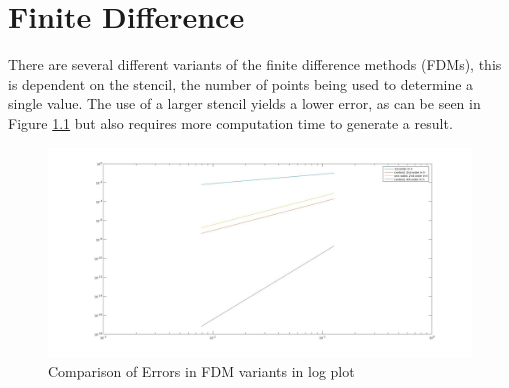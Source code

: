 \chapter{Finite Difference}
There are several different variants of the  finite difference methods (FDMs), this is dependent on the stencil, the number of points being used to determine a single value. The use of a larger stencil yields a lower error, as can be seen in Figure \ref{fig:errorgraph} but also requires more computation time to generate a result.
\begin{figure}[H] 
 \centering
 \includegraphics[width=\textwidth]{Images/Error.jpg}
 \caption{Comparison of Errors in FDM variants in log plot}
 \label{fig:errorgraph}
\end{figure}
